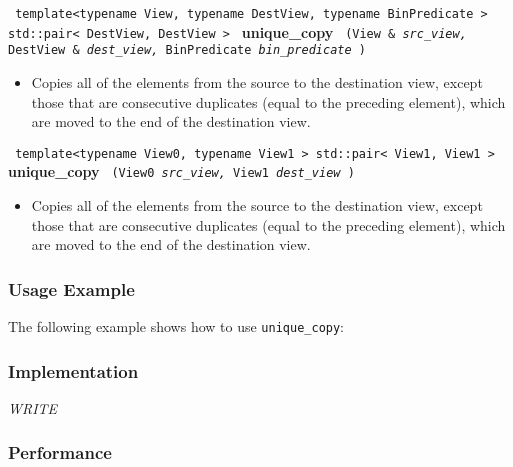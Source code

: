 \noindent
\texttt{%
template<typename View, typename DestView, typename BinPredicate >
\newline
std::pair< DestView, DestView > 
}
\newline
\textbf{unique\_copy}%
\texttt{%
(View \&
\textit{src\_view,}%
DestView \&
\textit{dest\_view,}%
BinPredicate 
\textit{bin\_predicate}%
)
}

\begin{itemize}
\item
Copies all of the elements from the source to the destination view, except those that are consecutive duplicates (equal to the preceding element), which are moved to the end of the destination view. 
\end{itemize}
 
\noindent
\texttt{%
template<typename View0, typename View1 >
\newline
std::pair< View1, View1 > 
}
\newline
\textbf{unique\_copy}%
\texttt{%
(View0 
\textit{src\_view,}%
View1 
\textit{dest\_view}%
)
}

\begin{itemize}
\item
Copies all of the elements from the source to the destination view, except those that are consecutive duplicates (equal to the preceding element), which are moved to the end of the destination view. 
\end{itemize}

\subsubsection{Usage Example} %

The following example shows how to use \texttt{unique\_copy}:

 
\subsubsection{Implementation} %

\textit{WRITE}

\subsubsection{Performance} %

